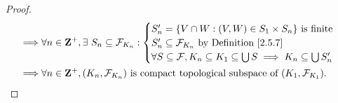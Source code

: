 \begin{proof}
\begin{align*}
        \implies & \forall n \in \mathbf{Z}^+, \exists\ S_n \subseteq \mathcal{F}_{K_n} : \begin{cases}
                                                                                      S_n' = \{V \cap W : (V, W) \in S_1 \times S_n\} \text{ is finite}  \\
                                                                                      S_n' \subseteq \mathcal{F}_{K_n} \text{ by Definition \ref{2.5.7}} \\
                                                                                      \forall S \subseteq \mathcal{F}, K_n \subseteq K_1 \subseteq \bigcup S \implies K_n \subseteq \bigcup S_n'
                                                                                  \end{cases} \\
        \implies & \forall n \in \mathbf{Z}^+, (K_n, \mathcal{F}_{K_n}) \text{ is compact topological subspace of } (K_1, \mathcal{F}_{K_1}).
    \end{align*}


\end{proof}
